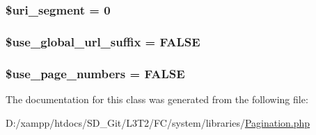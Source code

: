 \subsubsection[{\$uri\+\_\+segment}]{\setlength{\rightskip}{0pt plus 5cm}\$uri\+\_\+segment = 0\hspace{0.3cm}{\ttfamily [protected]}}\label{class_c_i___pagination_a79fd9718cc6c432f6919c28299584d77}
\hypertarget{class_c_i___pagination_aa2ec11ced927cd6f4e62fa19a4e35325}{}
\subsubsection[{\$use\+\_\+global\+\_\+url\+\_\+suffix}]{\setlength{\rightskip}{0pt plus 5cm}\$use\+\_\+global\+\_\+url\+\_\+suffix = F\+A\+L\+S\+E\hspace{0.3cm}{\ttfamily [protected]}}\label{class_c_i___pagination_aa2ec11ced927cd6f4e62fa19a4e35325}
\hypertarget{class_c_i___pagination_ac19b7d290389a9188ca6466f85d14a85}{}
\subsubsection[{\$use\+\_\+page\+\_\+numbers}]{\setlength{\rightskip}{0pt plus 5cm}\$use\+\_\+page\+\_\+numbers = F\+A\+L\+S\+E\hspace{0.3cm}{\ttfamily [protected]}}\label{class_c_i___pagination_ac19b7d290389a9188ca6466f85d14a85}


The documentation for this class was generated from the following file\+:\begin{DoxyCompactItemize}
\item 
D\+:/xampp/htdocs/\+S\+D\+\_\+\+Git/\+L3\+T2/\+F\+C/system/libraries/\hyperlink{_pagination_8php}{Pagination.\+php}\end{DoxyCompactItemize}
